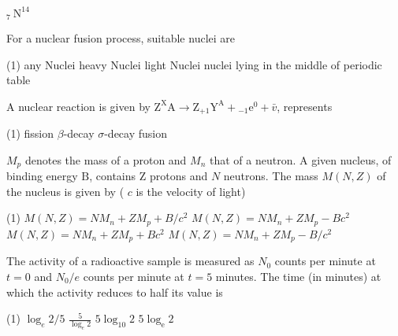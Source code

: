 \begin{enumerate}[ label=\color{ocre}\textbf{\arabic*.}]
\begin{tasks}
	\task[\textbf{D.}]${ }_{7} \mathrm{~N}^{14}$
\end{tasks}
\begin{minipage}{\textwidth}
	\item For a nuclear fusion process, suitable nuclei are
\end{minipage}
\begin{tasks}(1)
	\task[\textbf{A.}]any Nuclei 
	\task[\textbf{B.}] heavy Nuclei
	\task[\textbf{C.}]light Nuclei
	\task[\textbf{D.}]nuclei lying in the middle of periodic table
\end{tasks}
\begin{minipage}{\textwidth}
	\item A nuclear reaction is given by $\mathrm{Z}^{\mathrm{X}}{\mathrm{A}} \rightarrow \mathrm{Z}_{+1} \mathrm{Y}^{\mathrm{A}}+{ }_{-1} \mathrm{e}^{0}+\bar{v}$, represents
\end{minipage}
\begin{tasks}(1)
	\task[\textbf{A.}] fission
	\task[\textbf{B.}] $\beta$-decay
	\task[\textbf{C.}]$\sigma$-decay
	\task[\textbf{D.}]fusion
\end{tasks}
\begin{minipage}{\textwidth}
	\item $M_{p}$ denotes the mass of a proton and $M_{n}$ that of a neutron. A given nucleus, of binding energy $\mathrm{B}$, contains $\mathrm{Z}$ protons and $N$ neutrons. The mass $M(N, Z)$ of the nucleus is given by ( $c$ is the velocity of light)
\end{minipage}
\begin{tasks}(1)
	\task[\textbf{A.}]$M(N, Z)=N M_{n}+Z M_{p}+B / c^{2}$
	\task[\textbf{B.}] $M(N, Z)=N M_{n}+Z M_{p}-B c^{2}$
	\task[\textbf{C.}]$M(N, Z)=N M_{n}+Z M_{p}+B c^{2} $
	\task[\textbf{D.}]$	M(N, Z)=N M_{n}+Z M_{p}-B / c^{2}$
\end{tasks}
\begin{minipage}{\textwidth}
	\item The activity of a radioactive sample is measured as $N_{0}$ counts per minute at $t=0$ and $N_{0} / e$ counts per minute at $t=5$ minutes. The time (in minutes) at which the activity reduces to half its value is
\end{minipage}
\begin{tasks}(1)
	\task[\textbf{A.}] $\log _{e} 2 / 5$
	\task[\textbf{B.}] $\frac{5}{\log _{e} 2}$
	\task[\textbf{C.}] $5 \log _{10} 2$
	\task[\textbf{D.}]$5 \log _{\mathrm{e}} 2$
\end{tasks}
\begin{minipage}{\textwidth}

\end{minipage}
\end{enumerate}
